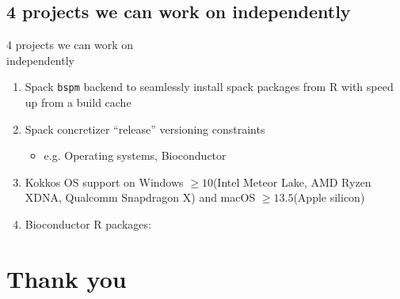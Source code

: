 \documentclass[
aspectratio=169,
xcolor={usenames}
]{beamer}
\begin{document}
\subsection{4 projects we can work on independently}
\begin{frame}{\hspace{8cm}4 projects we can work on\\%
    \hspace{8cm}independently}
  \begin{enumerate}[<+->]
  \item Spack \texttt{bspm} backend to seamlessly install spack packages from R
    with speed up from a build cache
  \item Spack concretizer ``release'' versioning constraints
    \begin{itemize}[<.->]
    \item e.g. Operating systems, Bioconductor
    \end{itemize}
  \item Kokkos OS support on %
    Windows $\ge 10$\footnotemark[1]
    (Intel Meteor Lake, AMD Ryzen XDNA, Qualcomm Snapdragon X) and %
    macOS $\ge 13.5$\footnotemark[2]
    (Apple silicon)
  \item Bioconductor R packages\footnotemark[3]:
  \end{enumerate}
\end{frame}

\section{Thank you}
\end{document}
